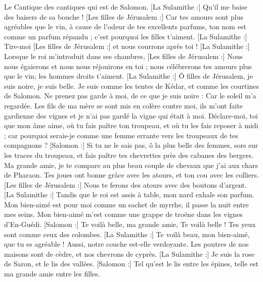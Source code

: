 \begin{multicols}{2}
\VerseOne{}Le Cantique des cantiques qui est de Salomon.
[La Sulamithe :] Qu'il me baise des baisers de sa bouche ! [Les filles de Jérusalem :] Car tes amours sont plus agréables que le vin,
à cause de l'odeur de tes excellents parfums, ton nom est comme un parfum  répandu ; c'est pourquoi les filles t'aiment.
[La Sulamithe :] Tire-moi [Les filles de Jérusalem :] et nous courrons après toi ! [La Sulamithe :] Lorsque le roi m'introduit dans ses chambres, [Les filles de Jérusalem :] Nous nous égaierons et nous nous réjouirons en toi ; nous célébrerons tes amours plus que le vin; les hommes droits t'aiment.
[La Sulamithe :] Ô filles de Jérusalem, je suis noire, je suis belle. Je suis comme les tentes de Kédar, et comme les courtines de Salomon.
Ne prenez pas garde à moi, de ce que je suis noire : Car le soleil m'a regardée. Les fils de ma mère se sont mis en colère contre moi, ils m'ont faite gardienne des vignes et je n'ai pas gardé la vigne qui était à moi.
Déclare-moi, toi que mon âme aime, où tu fais paître ton troupeau, et où tu les fais reposer à midi ; car pourquoi serais-je comme une femme errante vers les troupeaux de tes compagnons ?
[Salomon :] Si tu ne le sais pas, ô la plus belle des femmes, sors sur les traces du troupeau, et fais paître tes chevrettes près des cabanes des bergers.
Ma grande amie, je te compare au plus beau couple de chevaux que j'ai aux chars de Pharaon.
Tes joues ont bonne grâce avec les atours, et ton cou avec les colliers.
[Les filles de Jérusalem :] Nous te ferons des atours avec des boutons d'argent.
[La Sulamithe :] Tandis que le roi est assis à table, mon nard exhale son parfum.
Mon bien-aimé est pour moi comme un sachet de myrrhe, il passe la nuit entre mes seins.
Mon bien-aimé m'est comme une grappe de troëne dans les vignes d'En-Guédi.
[Salomon :] Te voilà belle, ma grande amie, Te voilà belle ! Tes yeux sont comme ceux des colombes.
[La Sulamithe :] Te voilà beau, mon bien-aimé, que tu es agréable ! Aussi, notre couche est-elle verdoyante.
Les poutres de nos maisons sont de cèdre, et nos chevrons de cyprès.
\VerseOne{}[La Sulamithe :] Je suis la rose de Saron, et le lis des vallées.
[Salomon :] Tel qu'est le lis entre les épines, telle est ma grande amie entre les filles.

\end{multicols}
